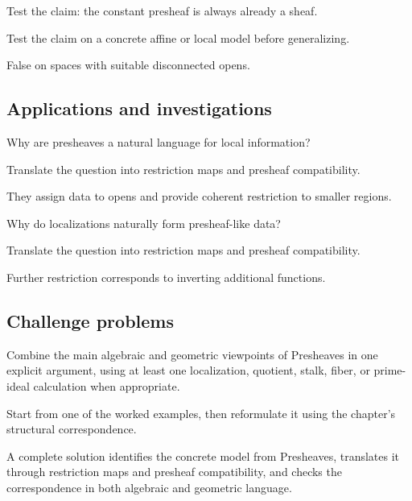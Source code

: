 \begin{exercise}\label{exr:vi12-expand-12}
Test the claim: the constant presheaf is always already a sheaf.
\end{exercise}
\begin{hint}
Test the claim on a concrete affine or local model before generalizing.
\end{hint}
\begin{solution}
False on spaces with suitable disconnected opens.
\end{solution}

\subsection*{Applications and investigations}

\begin{exercise}\label{exr:vi12-expand-13}
Why are presheaves a natural language for local information?
\end{exercise}
\begin{hint}
Translate the question into restriction maps and presheaf compatibility.
\end{hint}
\begin{solution}
They assign data to opens and provide coherent restriction to smaller regions.
\end{solution}

\begin{exercise}\label{exr:vi12-expand-14}
Why do localizations naturally form presheaf-like data?
\end{exercise}
\begin{hint}
Translate the question into restriction maps and presheaf compatibility.
\end{hint}
\begin{solution}
Further restriction corresponds to inverting additional functions.
\end{solution}

\subsection*{Challenge problems}

\begin{exercise}\label{exr:vi12-expand-15}
Combine the main algebraic and geometric viewpoints of Presheaves in one explicit argument, using at least one localization, quotient, stalk, fiber, or prime-ideal calculation when appropriate.
\end{exercise}
\begin{hint}
Start from one of the worked examples, then reformulate it using the chapter's structural correspondence.
\end{hint}
\begin{solution}
A complete solution identifies the concrete model from Presheaves, translates it through restriction maps and presheaf compatibility, and checks the correspondence in both algebraic and geometric language.
\end{solution}

